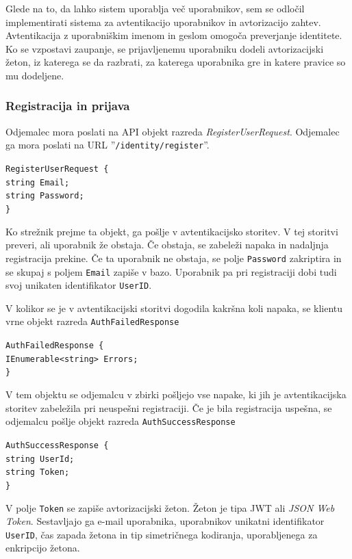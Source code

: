 \documentclass[a4paper, 12pt]{book}
\begin{document}
Glede na to, da lahko sistem uporablja več uporabnikov, sem se odločil implementirati sistema za avtentikacijo uporabnikov in avtorizacijo zahtev.
Avtentikacija z uporabniškim imenom in geslom omogoča preverjanje identitete.
Ko se vzpostavi zaupanje, se prijavljenemu uporabniku dodeli avtorizacijski žeton, iz katerega se da razbrati, za katerega uporabnika gre in katere pravice so mu dodeljene.

\subsubsection{Registracija in prijava}

Odjemalec mora poslati na API objekt razreda \textit{RegisterUserRequest}.
Odjemalec ga mora poslati na URL ''\texttt{/identity/register}''.

\noindent \texttt{RegisterUserRequest \{ \\
	string Email; \\
	string Password; \\
\} }

Ko strežnik prejme ta objekt, ga pošlje v avtentikacijsko storitev.
V tej storitvi preveri, ali uporabnik že obstaja.
Če obstaja, se zabeleži napaka in nadaljnja registracija prekine.
Če ta uporabnik ne obstaja, se polje \texttt{Password} zakriptira in se skupaj s poljem \texttt{Email} zapiše v bazo.
Uporabnik pa pri registraciji dobi tudi svoj unikaten identifikator \texttt{UserID}.

V kolikor se je v avtentikacijski storitvi dogodila kakršna koli napaka, se klientu vrne objekt razreda \texttt{AuthFailedResponse}

\noindent \texttt{AuthFailedResponse \{ \\
  IEnumerable<string> Errors; \\
\} }

\noindent V tem objektu se odjemalcu v zbirki pošljejo vse napake, ki jih je avtentikacijska storitev zabeležila pri neuspešni registraciji.  Če je bila registracija uspešna, se odjemalcu pošlje objekt razreda \texttt{AuthSuccessResponse}

\noindent \texttt{AuthSuccessResponse \{ \\
  string UserId; \\
  string Token; \\
\} }

\noindent V polje \texttt{Token} se zapiše avtorizacijski žeton.
Žeton je tipa JWT ali \textit{JSON Web Token}.
Sestavljajo ga e-mail uporabnika, uporabnikov unikatni identifikator \texttt{UserID}, čas zapada žetona in tip simetričnega kodiranja, uporabljenega za enkripcijo žetona.
\end{document}

